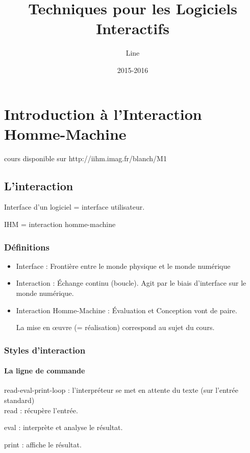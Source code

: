 \documentclass{report}
\title{\textbf{Techniques pour les Logiciels Interactifs}}
\author{Line \bsc{POUVARET}}
\date{2015-2016}
\begin{document}
\maketitle

\chapter{Introduction à l'Interaction Homme-Machine}

cours disponible sur http://iihm.imag.fr/blanch/M1

\section{L'interaction}

Interface d'un logiciel = interface utilisateur.

IHM = interaction homme-machine

\subsection{Définitions}


\begin{itemize}\renewcommand{\labelitemi}{$\bullet$}	
	\item Interface : Frontière entre le monde physique et le monde numérique
	\item Interaction : Échange continu (boucle). Agit par le biais d'interface sur le monde numérique.
	\item Interaction Homme-Machine : Évaluation et Conception vont de paire.
	
	La mise en œuvre (= réalisation) correspond au sujet du cours.
\end{itemize}

\subsection{Styles d'interaction}
\subsubsection{La ligne de commande}

read-eval-print-loop : l'interpréteur se met en attente du texte (sur l'entrée standard)\\

read : récupère l'entrée.

eval : interprète et analyse le résultat.

print : affiche le résultat.\\
\end{document}
